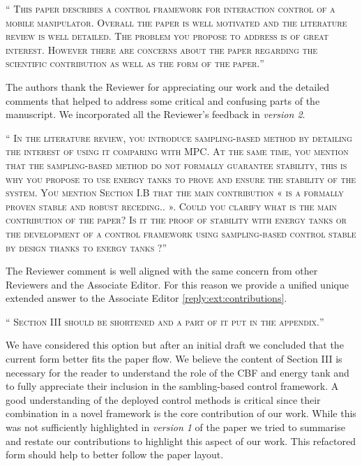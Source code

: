 \documentclass[10pt]{article}
\newcommand{\referee}[1]{\;
  \begin{minipage}[t]{.95\textwidth}
    ``{\small\color{red} \textsc{#1}}''
  \end{minipage}\medskip
  }
\newcommand{\version}[1]{\textit{version #1}}
\begin{document}
\begin{enumerate}[label={[R5:\,\arabic{enumi}]}]

\item\label{reply:R5:0}
\referee{This paper describes a control framework for interaction control of a mobile manipulator. Overall the paper is well motivated and the literature review is well detailed. The problem you propose to address is of great interest.  However there are concerns about the paper regarding the scientific contribution as well as the form of the paper.}

The authors thank the Reviewer for appreciating our work and the detailed comments that helped to address some critical and confusing parts of the manuscript. We incorporated all the Reviewer's feedback in \version{2}.

\item\label{reply:R5:1} 
\referee{In the literature review, you introduce sampling-based method by detailing the interest of using it comparing with MPC. At the same time, you mention that the sampling-based method do not formally guarantee stability, this is why you propose to use energy tanks to prove and ensure the stability of the system. You mention Section I.B that the main contribution « is a formally proven stable and robust receding.. ». Could you clarify what is the main contribution of the paper? Is it the proof of stability with energy tanks or the development of a control framework using sampling-based control stable by design thanks to energy tanks ?}

The Reviewer comment is well aligned with the same concern from other Reviewers and the Associate Editor. For this reason we provide a unified unique extended answer to the Associate Editor \ref{reply:ext:contributions}.

\item\label{reply:R5:2} 
\referee{Section III should be shortened and a part of it put in the appendix.}

We have considered this option but after an initial draft we concluded that the current form better fits the paper flow. We believe the content of Section III is necessary for the reader to understand the role of the CBF and energy tank and to fully appreciate their inclusion in the sambling-based control framework. A good understanding of the deployed control methods is critical since their combination in a novel framework is the core contribution of our work. While this was not sufficiently highlighted in \version{1} of the paper we tried to summarise and restate our contributions to highlight this aspect of our work. This refactored form should help to better follow the paper layout.



\end{enumerate}
\end{document}
